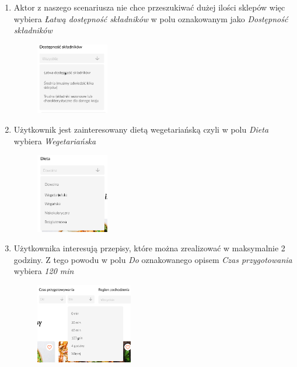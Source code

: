 \documentclass{article}
\begin{document}
\begin{enumerate}
    \item Aktor z naszego scenariusza nie chce przeszukiwać dużej ilości sklepów więc wybiera \textit{Łatwą dostępność składników} w polu oznakowanym jako \textit{Dostępność składników}
        \begin{figure}[H]
            \begin{center}
                \includegraphics[width=0.3\textwidth]{images/find_recipe_step4}
            \end{center}
        \end{figure}
    \item Użytkownik jest zainteresowany dietą wegetariańską czyli w polu \textit{Dieta} wybiera \textit{Wegetariańska}
        \begin{figure}[H]
            \begin{center}
                \includegraphics[width=0.3\textwidth]{images/find_recipe_step5}
            \end{center}
        \end{figure}
    \item Użytkownika interesują przepisy, które można zrealizować w maksymalnie 2 godziny. Z tego powodu w polu \textit{Do} oznakowanego opisem \textit{Czas przygotowania} wybiera \textit{120 min}
        \begin{figure}[H]
            \begin{center}
                \includegraphics[width=0.4\textwidth]{images/find_recipe_step6}

\end{center}
\end{figure}
\end{enumerate}
\end{document}
